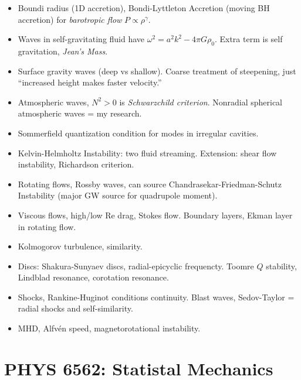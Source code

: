 \documentclass[11pt,
        usenames, %
        dvipsnames %
    ]{article}
\begin{document}
\begin{itemize}
    \item Boundi radius (1D accretion), Bondi-Lyttleton Accretion (moving BH
        accretion) for \emph{barotropic flow} $P \propto \rho^\gamma$.

    \item Waves in self-gravitating fluid have $\omega^2 = a^2k^2 - 4\pi G
        \rho_0$. Extra term is self gravitation, \emph{Jean's Mass}.

    \item Surface gravity waves (deep vs shallow). Coarse treatment of
        steepening, just ``increased height makes faster velocity.''

    \item Atmospheric waves, $N^2 > 0$ is \emph{Schwarzchild criterion}.
        Nonradial spherical atmospheric waves = my research.

    \item Sommerfield quantization condition for modes in irregular cavities.

    \item Kelvin-Helmholtz Instability: two fluid streaming. Extension: shear
        flow instability, Richardson criterion.

    \item Rotating flows, Rossby waves, can source Chandrasekar-Friedman-Schutz
        Instability (major GW source for quadrupole moment).

    \item Viscous flows, high/low Re drag, Stokes flow. Boundary layers, Ekman
        layer in rotating flow.

    \item Kolmogorov turbulence, similarity.

    \item Discs: Shakura-Sunyaev discs, radial-epicyclic frequencty. Toomre $Q$
        stability, Lindblad resonance, corotation resonance.

    \item Shocks, Rankine-Huginot conditions continuity. Blast waves,
        Sedov-Taylor = radial shocks and self-similarity.

    \item MHD, Alfv\'en speed, magnetorotational instability.
\end{itemize}

\section{PHYS 6562: Statistal Mechanics}
\end{document}
